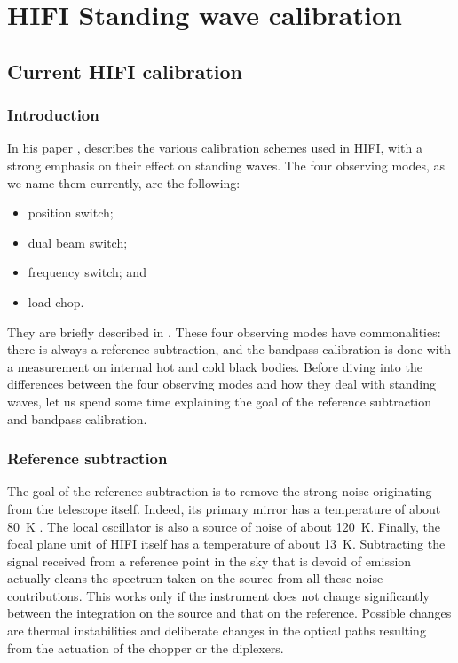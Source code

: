 \cleardoublepage
\chapter{HIFI Standing wave calibration}
\label{sec:chapter4}

\section{Current HIFI calibration}

\subsection{Introduction}
In his paper  \cite{ossenkopf2002intensity}, \citeauthor{ossenkopf2002intensity} describes the various calibration schemes used in HIFI, with a strong emphasis on their effect on standing waves.
The four observing modes, as we name them currently, are the following:
\begin{itemize}
    \item position switch;
    \item dual beam switch;
    \item frequency switch; and
    \item load chop.
\end{itemize}
They are briefly described in  \cite{AA_537_A17}.
These four observing modes have commonalities: there is always a reference subtraction, and the bandpass calibration is done with a measurement on internal hot and cold black bodies.
Before diving into the differences between the four observing modes and how they deal with standing waves, let us spend some time explaining the goal of the reference subtraction and bandpass calibration.

\subsection{Reference subtraction}
The goal of the reference subtraction is to remove the strong noise originating from the telescope itself.
Indeed, its primary mirror has a temperature of about \SI{80}{\kelvin} \cite{Sein2004mirror}.
The local oscillator is also a source of noise of about \SI{120}{\kelvin}.
Finally, the focal plane unit of HIFI itself has a temperature of about \SI{13}{\kelvin}.
Subtracting the signal received from a reference point in the sky that is devoid of emission actually cleans the spectrum taken on the source from all these noise contributions.
This works only if the instrument does not change significantly between the integration on the source and that on the reference.
Possible changes are thermal instabilities and deliberate changes in the optical paths resulting from the actuation of the chopper or the diplexers.

